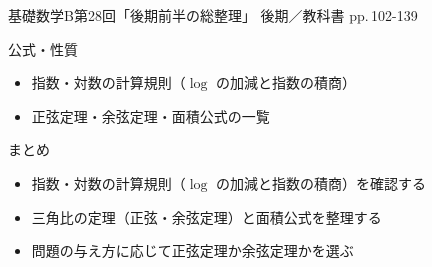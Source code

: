 \documentclass[aspectratio=43,professionalfonts,handout]{beamer}
\newcommand{\LectureNum}{28}
\newcommand{\LectureTitle}{後期前半の総整理}
\newcommand{\TextPages}{pp.\,102-139}
\newcommand{\CourseName}{基礎数学B}
\renewcommand{\TermName}{後期}
\begin{document}
\begin{frame}{\CourseName\quad 第\LectureNum 回「\LectureTitle 」}
  {\small \TermName\quad \TeacherName\quad ／\quad 教科書 \TextPages}

\end{frame}

\begin{frame}{公式・性質}
  \begin{block}{}
  \begin{itemize}
    \item 指数・対数の計算規則（$\log$ の加減と指数の積商）
    \item 正弦定理・余弦定理・面積公式の一覧
  \end{itemize}
  \end{block}
\end{frame}

\begin{frame}{まとめ}
  \begin{itemize}
    \item 指数・対数の計算規則（$\log$ の加減と指数の積商）を確認する
    \item 三角比の定理（正弦・余弦定理）と面積公式を整理する
    \item 問題の与え方に応じて正弦定理か余弦定理かを選ぶ
  \end{itemize}
\end{frame}
\end{document}
